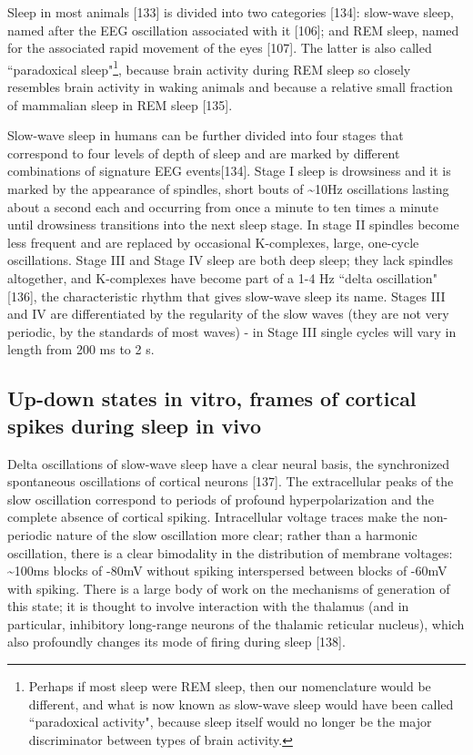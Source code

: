 \documentclass[]{article}
\begin{document}
Sleep in most animals {[}133{]} is divided into two categories
{[}134{]}: slow-wave sleep, named after the EEG oscillation associated
with it {[}106{]}; and REM sleep, named for the associated rapid
movement of the eyes {[}107{]}. The latter is also called ``paradoxical
sleep"\footnote{Perhaps if most sleep were REM sleep, then our
  nomenclature would be different, and what is now known as slow-wave
  sleep would have been called ``paradoxical activity", because sleep
  itself would no longer be the major discriminator between types of
  brain activity.}, because brain activity during REM sleep so closely
resembles brain activity in waking animals and because a relative small
fraction of mammalian sleep in REM sleep {[}135{]}.

Slow-wave sleep in humans can be further divided into four stages that
correspond to four levels of depth of sleep and are marked by different
combinations of signature EEG events{[}134{]}. Stage I sleep is
drowsiness and it is marked by the appearance of spindles, short bouts
of \textasciitilde{}10Hz oscillations lasting about a second each and
occurring from once a minute to ten times a minute until drowsiness
transitions into the next sleep stage. In stage II spindles become less
frequent and are replaced by occasional K-complexes, large, one-cycle
oscillations. Stage III and Stage IV sleep are both deep sleep; they
lack spindles altogether, and K-complexes have become part of a 1-4 Hz
``delta oscillation" {[}136{]}, the characteristic rhythm that gives
slow-wave sleep its name. Stages III and IV are differentiated by the
regularity of the slow waves (they are not very periodic, by the
standards of most waves) - in Stage III single cycles will vary in
length from 200 ms to 2 s.

\subsection{Up-down states in vitro, frames of cortical spikes during
sleep in vivo}

Delta oscillations of slow-wave sleep have a clear neural basis, the
synchronized spontaneous oscillations of cortical neurons {[}137{]}. The
extracellular peaks of the slow oscillation correspond to periods of
profound hyperpolarization and the complete absence of cortical spiking.
Intracellular voltage traces make the non-periodic nature of the slow
oscillation more clear; rather than a harmonic oscillation, there is a
clear bimodality in the distribution of membrane voltages:
\textasciitilde{}100ms blocks of -80mV without spiking interspersed
between blocks of -60mV with spiking. There is a large body of work on
the mechanisms of generation of this state; it is thought to involve
interaction with the thalamus (and in particular, inhibitory long-range
neurons of the thalamic reticular nucleus), which also profoundly
changes its mode of firing during sleep {[}138{]}.
\end{document}
